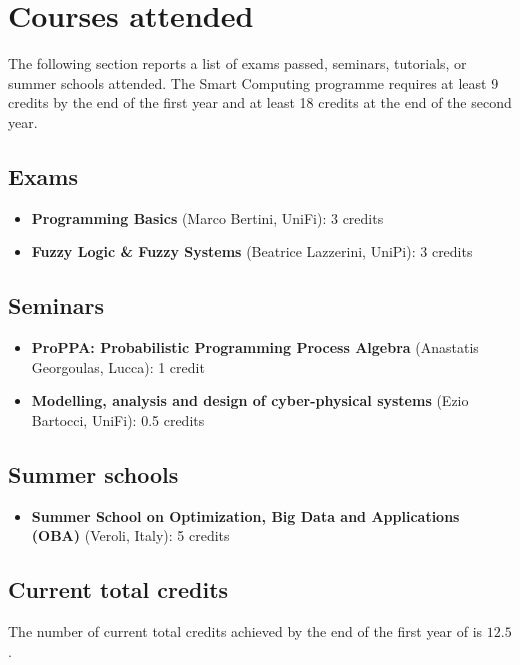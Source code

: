 
\section*{Courses attended}
  The following section reports a list of exams passed, seminars, tutorials, or summer schools attended. The Smart Computing  programme requires at least 9 credits by the end of the first year and at least 18 credits at the end of the second year.

  \subsection*{Exams}
  
    \begin{itemize}
      \item \textbf{ Programming Basics} (Marco Bertini, \ac{UniFi}): 3 credits
      \item \textbf{Fuzzy Logic \& Fuzzy Systems} (Beatrice Lazzerini, \ac{UniPi}): 3 credits
    \end{itemize}
    
  \subsection*{Seminars}
  
    \begin{itemize}
      \item \textbf{\ac{ProPPA}: Probabilistic Programming Process Algebra} (Anastatis Georgoulas,  Lucca): 1 credit
      \item \textbf{Modelling, analysis and design of cyber-physical systems} (Ezio Bartocci, \ac{UniFi}): 0.5 credits
    \end{itemize}
    
  \subsection*{Summer schools}
  
    \begin{itemize}
      \item \textbf{Summer School on Optimization, Big Data and Applications (\ac{OBA})} (Veroli, Italy): 5 credits
    \end{itemize}
    
  \subsection*{Current total credits}
  
    The number of current total credits achieved by the end of the first year of  is $12.5$.
    
\newpage
  